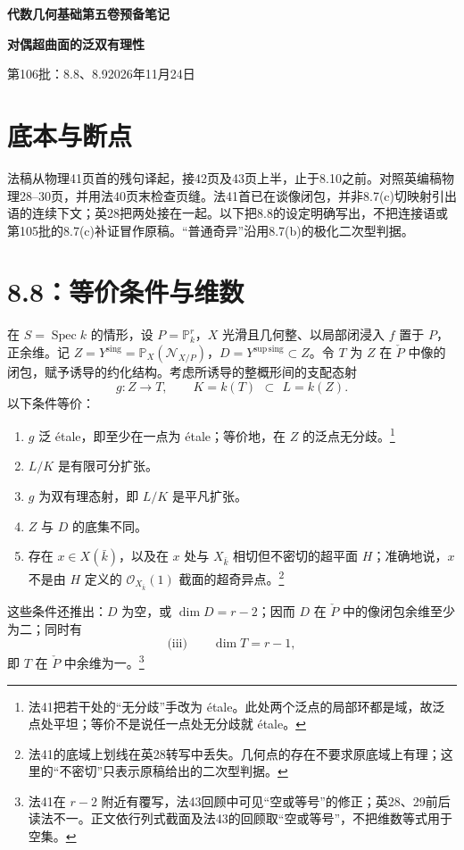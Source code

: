 \documentclass[openany,fontset=fandol]{ctexbook}
\newcommand{\PD}{\check P}
\newcommand{\Ys}{Y^{\mathrm{sing}}}
\newcommand{\Ds}{Y^{\mathrm{sup\,sing}}}
\DeclareMathOperator{\Spec}{Spec}
\begin{document}
\begin{center}
{\Large\bfseries 代数几何基础第五卷预备笔记}\par\medskip
{\LARGE\bfseries 对偶超曲面的泛双有理性}\par\medskip
第106批：8.8、8.9\quad 2026年11月24日
\end{center}
\smallskip

\section*{底本与断点}
法稿从物理41页首的残句译起，接42页及43页上半，止于8.10之前。对照英编稿物理28--30页，并用法40页末检查页缝。法41首已在谈像闭包，并非8.7(c)切映射引出语的连续下文；英28把两处接在一起。以下把8.8的设定明确写出，不把连接语或第105批的8.7(c)补证冒作原稿。“普通奇异”沿用8.7(b)的极化二次型判据。

\section*{8.8：等价条件与维数}
在 $S=\Spec k$ 的情形，设 $P=\mathbb P^r_k$，$X$ 光滑且几何整、以局部闭浸入 $f$ 置于 $P$，正余维。记 $Z=\Ys=\mathbb P_X(\mathcal N_{X/P})$，$D=\Ds\subset Z$。令 $T$ 为 $Z$ 在 $\PD$ 中像的闭包，赋予诱导的约化结构。考虑所诱导的整概形间的支配态射
\[
 g:Z\longrightarrow T,\qquad K=k(T)\ \,\subset\,\ L=k(Z).
\]
以下条件等价：
\begin{enumerate}
\renewcommand{\labelenumi}{\textnormal{(\roman{enumi})}}
\item $g$ 泛 étale，即至少在一点为 étale；等价地，在 $Z$ 的泛点无分歧。\footnote{法41把若干处的“无分歧”手改为 étale。此处两个泛点的局部环都是域，故泛点处平坦；等价不是说任一点处无分歧就 étale。}
\item[(i bis)] $L/K$ 是有限可分扩张。
\item[(i ter)] $g$ 为双有理态射，即 $L/K$ 是平凡扩张。
\item[(ii)] $Z$ 与 $D$ 的底集不同。
\item[(ii bis)] 存在 $x\in X(\bar k)$，以及在 $x$ 处与 $X_{\bar k}$ 相切但不密切的超平面 $H$；准确地说，$x$ 不是由 $H$ 定义的 $\mathcal O_{X_{\bar k}}(1)$ 截面的超奇异点。\footnote{法41的底域上划线在英28转写中丢失。几何点的存在不要求原底域上有理；这里的“不密切”只表示原稿给出的二次型判据。}
\end{enumerate}
这些条件还推出：$D$ 为空，或 $\dim D=r-2$；因而 $D$ 在 $\PD$ 中的像闭包余维至少为二；同时有
\[
 \text{(iii)}\qquad \dim T=r-1,
\]
即 $T$ 在 $\PD$ 中余维为一。\footnote{法41在 $r-2$ 附近有覆写，法43回顾中可见“空或等号”的修正；英28、29前后读法不一。正文依行列式截面及法43的回顾取“空或等号”，不把维数等式用于空集。}
\end{document}
